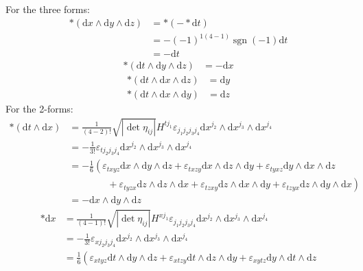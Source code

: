 \documentclass[12pt,a4]{article}
\DeclareMathOperator{\sign}{sgn}
\newcommand{\e}{\mathrm{d}}
\begin{document}
\begin{enumerate}
\begin{enumerate}
        For the three forms:
        \begin{align*}
          *(\e x \wedge \e y \wedge \e z) 
            &= *(- *\e t)\\
            &= - (-1)^{1(4 - 1)} \sign(-1) \e t\\
            &= - \e t
        \end{align*}
        \begin{align*}
          *(\e t \wedge \e y \wedge \e z) 
            &= - \e x
        \end{align*}
        \begin{align*}
          *(\e t \wedge \e x \wedge \e z) 
            &= \e y
        \end{align*}
        \begin{align*}
          *(\e t \wedge \e x \wedge \e y) 
            &= \e z
        \end{align*}
        For the 2-forms:
        \begin{align*}
          *(\e t \wedge \e x)
                 &= \frac{1}{(4 - 2)!} \sqrt{|\det{\eta_{ij}}|} H^{t j_1} \varepsilon_{j_1 j_2 j_3 j_4} \e x^{j_2} \wedge \e x^{j_3} \wedge \e x^{j_4}\\
                 &= - \frac{1}{3!}  \varepsilon_{t j_2 j_3 j_4} \e x^{j_2} \wedge \e x^{j_3} \wedge \e x^{j_4}\\
                 &= - \frac{1}{6}  \left(\varepsilon_{t x y z} \e x \wedge \e y \wedge \e z + \varepsilon_{t x z y} \e x \wedge \e z \wedge \e y + \varepsilon_{t y x z} \e y \wedge \e x \wedge \e z\right.\\
                 &\qquad \qquad +\left. \varepsilon_{t y z x} \e z \wedge \e z \wedge \e x + \varepsilon_{t z x y} \e z \wedge \e x \wedge \e y + \varepsilon_{t z y x} \e z \wedge \e y \wedge \e x\right)\\
                 &= -  \e x \wedge \e y \wedge \e z
        \end{align*}
        \begin{align*}
          *\e x
                 &= \frac{1}{(4 - 1)!} \sqrt{|\det{\eta_{ij}}|} H^{x j_1} \varepsilon_{j_1 j_2 j_3 j_4} \e x^{j_2} \wedge \e x^{j_3} \wedge \e x^{j_4}\\
                 &= - \frac{1}{3!}  \varepsilon_{x j_2 j_3 j_4} \e x^{j_2} \wedge \e x^{j_3} \wedge \e x^{j_4}\\
                 &= \frac{1}{6}  \left(\varepsilon_{x t y z} \e t \wedge \e y \wedge \e z + \varepsilon_{x t z y} \e t \wedge \e z \wedge \e y + \varepsilon_{x y t z} \e y \wedge \e t \wedge \e z\right.\\

\end{align*}
\end{enumerate}
\end{enumerate}
\end{document}
